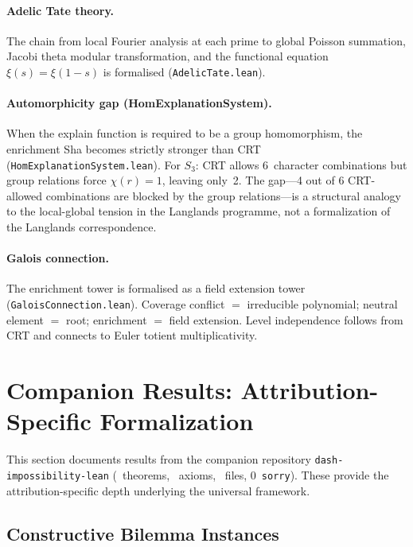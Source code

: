\documentclass[11pt,a4paper]{article}
\begin{document}
\paragraph{Adelic Tate theory.}
The chain from local Fourier analysis at each prime to global Poisson summation, Jacobi theta modular transformation, and the functional equation $\xi(s) = \xi(1-s)$ is formalised (\texttt{AdelicTate.lean}).

\paragraph{Automorphicity gap (HomExplanationSystem).}
When the explain function is required to be a group homomorphism, the enrichment Sha becomes strictly stronger than CRT (\texttt{HomExplanationSystem.lean}).  For $S_3$: CRT allows 6~character combinations but group relations force $\chi(r) = 1$, leaving only~2.  The gap---4 out of 6 CRT-allowed combinations are blocked by the group relations---is a structural analogy to the local-global tension in the Langlands programme, not a formalization of the Langlands correspondence.

\paragraph{Galois connection.}
The enrichment tower is formalised as a field extension tower (\texttt{GaloisConnection.lean}).  Coverage conflict $=$ irreducible polynomial; neutral element $=$ root; enrichment $=$ field extension.  Level independence follows from CRT and connects to Euler totient multiplicativity.


\section{Companion Results: Attribution-Specific Formalization}
\label{sec:companion-attribution}

This section documents results from the companion repository \texttt{dash-impossibility-lean} (\ClaimDashTheorems~theorems, \ClaimDashAxioms~axioms, \ClaimDashFiles~files, 0~\texttt{sorry}).  These provide the attribution-specific depth underlying the universal framework.

\subsection{Constructive Bilemma Instances}
\end{document}
